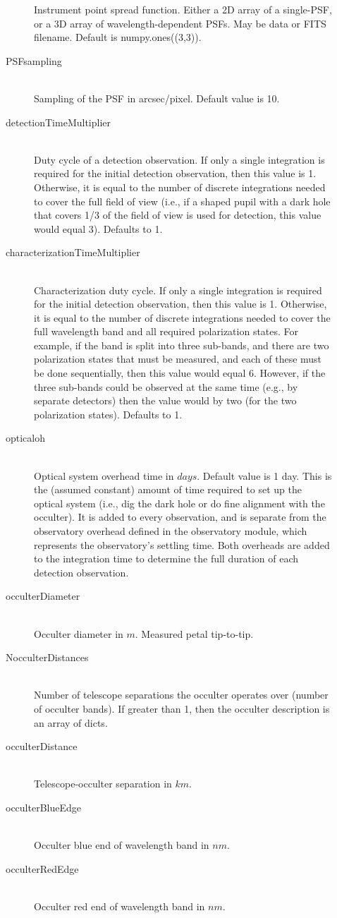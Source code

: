 \documentclass[cleanfoot]{asme2ej}
\begin{document}
\begin{description}
\begin{description}
    Instrument point spread function. Either a 2D array of a single-PSF, or a 3D array of wavelength-dependent PSFs. May be data or FITS filename. Default is numpy.ones((3,3)).
    \item[PSFsampling] \hfill \\
    Sampling of the PSF in arcsec/pixel. Default value is 10.
    \item[detectionTimeMultiplier]\hfill \\
    Duty cycle of a detection observation.  If only a single integration is required for the initial detection observation, then this value is 1.  Otherwise, it is equal to the number of discrete integrations needed to cover the full field of view (i.e., if a shaped pupil with a dark hole that covers 1/3 of the field of view is used for detection, this value would equal 3).  Defaults to 1.
    \item[characterizationTimeMultiplier]\hfill \\
    Characterization duty cycle.  If only a single integration is required for the initial detection observation, then this value is 1.  Otherwise, it is equal to the number of discrete integrations needed to cover the full wavelength band and all required polarization states.  For example, if the band is split into three sub-bands, and there are two polarization states that must be measured, and each of these must be done sequentially, then this value would equal 6.  However, if the three sub-bands could be observed at the same time (e.g., by separate detectors) then the value would by two (for the two polarization states). Defaults to 1.
    \item[opticaloh] \hfill \\
    Optical system overhead time in $days$.  Default value is 1 day.  This is the (assumed constant) amount of time required to set up the optical system (i.e., dig the dark hole or do fine alignment with the occulter).  It is added to every observation, and is separate from the observatory overhead defined in the observatory module, which represents the observatory's settling time.  Both overheads are added to the integration time to determine the full duration of each detection observation.
    \item[occulterDiameter]\hfill \\
    Occulter diameter in $ m $.  Measured petal tip-to-tip.
    \item [NocculterDistances]\hfill \\
    Number of telescope separations the occulter operates over (number of occulter bands). If greater than 1, then the occulter description is an array of dicts.
    \item[occulterDistance]\hfill \\
    Telescope-occulter separation in $km$.
    \item[occulterBlueEdge]\hfill \\
    Occulter blue end of wavelength band in $nm$.
    \item[occulterRedEdge]\hfill \\
    Occulter red end of wavelength band in $nm$.
    \end{description}
    

\end{description}
\end{document}
